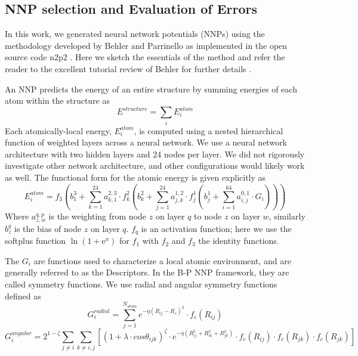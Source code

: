 \documentclass{article}
\begin{document}
\subsection{NNP selection and Evaluation of Errors} \label{sct:nnp_select_and_eval}

In this work, we generated neural network potentials (NNPs) using the methodology developed by Behler and Parrinello\cite{Behler2007} as implemented in the open source code n2p2 \cite{Singraber2019ParallelPotentials}.  Here we sketch the essentials of the method and refer the reader to the excellent tutorial review of Behler for further details \cite{Behler2015}. 

An NNP predicts the energy of an entire structure by summing energies of each atom within the structure as 
\begin{equation}
E^{structure} = \sum_i E^{atom}_i
\end{equation}
Each atomically-local energy, $E^{atom}_i$, is computed using a nested hierarchical function of weighted layers across a neural network.
We use a neural network architecture with two hidden layers and 24 nodes per layer.  We did not rigorously investigate other network architecture, and other configurations would likely work as well.  The functional form for the atomic energy is given explicitly as
\begin{equation}
E^{atom}_i = f_3 ( b^3_1+\sum^{24}_{k=1}a^{2,3}_{k,1}\cdot f^2_k(b^2_k+\sum^{24}_{j=1}a^{1,2}_{j,k}\cdot f^1_j ( b^1_j + \sum^{64}_{i=1} a^{0,1}_{i,j}\cdot G_i  ))) 
\end{equation}
Where $a^{q,p}_{z,w}$ is the weighting from node $z$ on layer $q$ to node $z$ on layer $w$, similarly $b^q_z$ is
the bias of node $z$ on layer $q$. $f_q$ is an activation function; here we use the softplus function 
$\ln (1 + \mathrm{e}^x)$ for $f_1$ with $f_2$ and $f_3$ the identity functions.

The $G_i$ are functions used to characterize a local atomic environment, and are generally referred to as the Descriptors. In the B-P NNP framework,
they are called symmetry functions.  We use radial and angular symmetry functions defined as
\begin{equation}
G^{radial}_i = \sum^{N_{atom}}_{j=1}e^{-\eta(R_{ij}-R_{s})^2}\cdot f_c(R_{ij})
\end{equation}
\begin{equation}
G^{angular}_i = 2^{1-\zeta}\sum_{j\neq i}\sum_{k\neq i,j}[ (1+\lambda\cdot cos\theta_{ijk})^\zeta \cdot e^{-\eta(R^2_{ij}+R^2_{ik}+R^2_{jk})}\cdot f_c(R_{ij}) \cdot f_c(R_{jk}) \cdot f_c(R_{jk}) ]
\end{equation}
\end{document}
